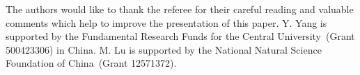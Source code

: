 \documentclass[
final
]{dmtcs-episciences}
\begin{document}
\acknowledgements
\label{sec:ack}
The authors would like to thank the referee for their careful reading and valuable comments which help to improve the presentation of this paper.
Y. Yang is supported by the Fundamental Research Funds for the Central University~(Grant 500423306) in China.
M. Lu is supported by the National Natural Science Foundation of China~(Grant 12571372).

\nocite{*}

%

\label{sec:biblio}
\end{document}
